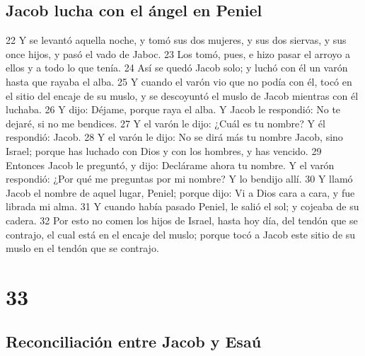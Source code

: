 \section*{Jacob lucha con el ángel en Peniel}

22 Y se levantó aquella noche, y tomó sus dos mujeres, y sus dos siervas, y sus once hijos, y pasó el vado de Jaboc.
23 Los tomó, pues, e hizo pasar el arroyo a ellos y a todo lo que tenía.
24 Así se quedó Jacob solo; y luchó con él un varón hasta que rayaba el alba.
25 Y cuando el varón vio que no podía con él, tocó en el sitio del encaje de su muslo, y se descoyuntó el muslo de Jacob mientras con él luchaba.
26 Y dijo: Déjame, porque raya el alba. Y Jacob le respondió: No te dejaré, si no me bendices.
27 Y el varón le dijo: ¿Cuál es tu nombre? Y él respondió: Jacob.
28 Y el varón le dijo: No se dirá más tu nombre Jacob, sino Israel; porque has luchado con Dios y con los hombres, y has vencido.
29 Entonces Jacob le preguntó, y dijo: Declárame ahora tu nombre. Y el varón respondió: ¿Por qué me preguntas por mi nombre? Y lo bendijo allí.
30 Y llamó Jacob el nombre de aquel lugar, Peniel; porque dijo: Vi a Dios cara a cara, y fue librada mi alma.
31 Y cuando había pasado Peniel, le salió el sol; y cojeaba de su cadera.
32 Por esto no comen los hijos de Israel, hasta hoy día, del tendón que se contrajo, el cual está en el encaje del muslo; porque tocó a Jacob este sitio de su muslo en el tendón que se contrajo.

\chapter{33}

\section*{Reconciliación entre Jacob y Esaú}

